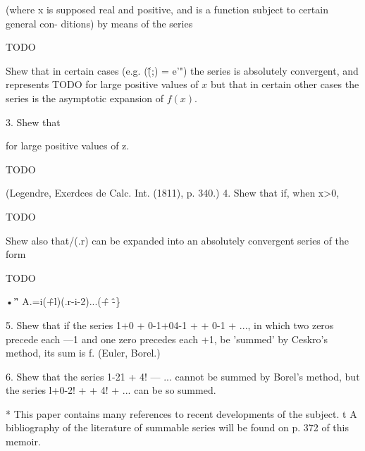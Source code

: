 (where x is supposed real and positive, and is a function subject to certain general con-
ditions) by means of the series

TODO

Shew that in certain cases (e.g. (\^(;) = e'") the series is absolutely convergent, and
represents TODO for large positive values of $x$ but that in certain other cases the series is
the asymptotic expansion of $f(x)$.

3. Shew that

for large positive values of z.

TODO

(Legendre, Exerdces de Calc. Int. (1811), p. 340.)
4. Shew that if, when x>0,

TODO

Shew also that/(.r) can be expanded into an absolutely convergent series of the form

TODO

•'\^ ' A.=i(\^+l)(.r-i-2)...(\^ + \^-\}

5. Shew that if the series 1+0 + 0-1+04-1 + + 0-1 + ..., in which two
zeros precede each —1 and one zero precedes each +1, be 'summed' by
Ceskro's method, its sum is f. (Euler, Borel.)

6. Shew that the series 1-21 + 4! — ... cannot be summed by Borel's
method, but the series l+0-2! + + 4! + ... can be so summed.

* This paper contains many references to recent developments of the
subject. 
t A bibliography of the literature of summable series will be found on p. 372 of this
memoir.